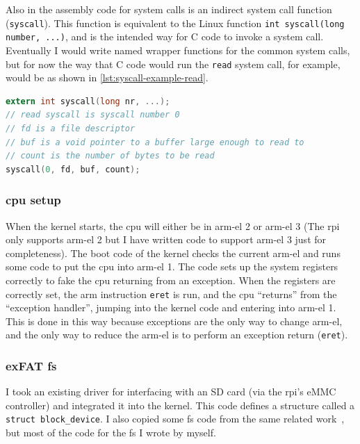 \documentclass{article}
\begin{document}
Also in the assembly code for system calls is an indirect system call function
(\verb!syscall!). This function is equivalent to the Linux function
\verb!int syscall(long number, ...)!, and is the intended way for C code to
invoke a system call. Eventually I would write named wrapper functions for the
common system calls, but for now the way that C code would run the
\texttt{read} system call, for example, would be as shown in
\autoref{lst:syscall-example-read}.

\begin{lstlisting}[language=C, caption={How some C code would invoke the system
                   call \texttt{read} in the current implementation.}, float,
                   label={lst:syscall-example-read}]
extern int syscall(long nr, ...);
// read syscall is syscall number 0
// fd is a file descriptor
// buf is a void pointer to a buffer large enough to read to
// count is the number of bytes to be read
syscall(0, fd, buf, count);
\end{lstlisting}

\subsubsection{\texorpdfstring{\gls{cpu}}{CPU} setup}
\label{sec:impl_cpu_setup}
When the kernel starts, the \gls{cpu} will either be in \gls{arm-el} 2 or
\gls{arm-el} 3 (The \gls{rpi} only supports \gls{arm-el} 2 but I have written
code to support \gls{arm-el} 3 just for completeness). The boot code of the
kernel checks the current \gls{arm-el} and runs some code to put the \gls{cpu}
into \gls{arm-el} 1. The code sets up the system registers correctly to fake
the \gls{cpu} returning from an exception. When the registers are correctly
set, the \gls{arm} instruction \texttt{eret} is run, and the \gls{cpu}
``returns'' from the ``exception handler'', jumping into the kernel code and
entering into \gls{arm-el} 1. This is done in this way because exceptions are
the only way to change \gls{arm-el}, and the only way to reduce the
\gls{arm-el} is to perform an exception return (\texttt{eret}).

\subsubsection{exFAT \texorpdfstring{\gls{fs}}{Filesystem}}
\label{sec:impl_fs}
I took an existing driver for interfacing with an SD card (via the \gls{rpi}'s
eMMC controller) and integrated it into the kernel. This code defines a
structure called a \verb!struct block_device!. I also copied some \gls{fs} code
from the same related work~\cite{rpi-boot-gh}, but most of the code for the
\gls{fs} I wrote by myself.
\end{document}
